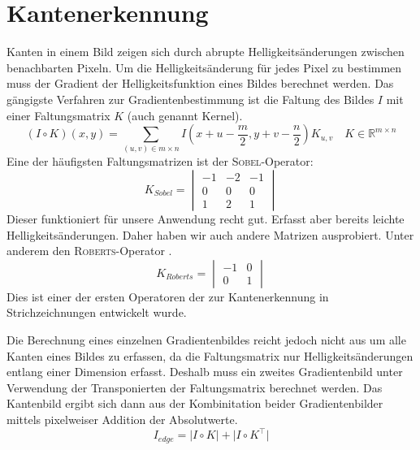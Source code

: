\section*{Kantenerkennung}

Kanten in einem Bild zeigen sich durch abrupte Helligkeitsänderungen zwischen
benachbarten Pixeln.
Um die Helligkeitsänderung für jedes Pixel zu bestimmen muss der Gradient der
Helligkeitsfunktion eines Bildes berechnet werden.
Das gängigste Verfahren zur Gradientenbestimmung ist die Faltung des Bildes $I$
mit einer Faltungsmatrix $K$ (auch genannt Kernel).
  \[ (I\circ K)(x,y) =
       \sum_{(u,v)\in m\times n}
       I\left(x+u-\frac{m}{2},y+v-\frac{n}{2}\right)K_{u,v}
       \quad K\in\mathbb{R}^{m\times n} \]
Eine der häufigsten Faltungsmatrizen ist der \textsc{Sobel}-Operator:
  \[ K_{Sobel} = \begin{vmatrix}
           -1 & -2 & -1 \\
            0 &  0 &  0 \\
            1 &  2 &  1
         \end{vmatrix} \]
Dieser funktioniert für unsere Anwendung recht gut. Erfasst aber bereits leichte
Helligkeitsänderungen.
Daher haben wir auch andere Matrizen ausprobiert.
Unter anderem den \textsc{Roberts}-Operator \cite{DBLP:books/garland/Roberts63}.
  \[ K_{Roberts} = \begin{vmatrix}
           -1 & 0 \\
            0 & 1
         \end{vmatrix} \]
Dies ist einer der ersten Operatoren der zur Kantenerkennung in
Strichzeichnungen entwickelt wurde.

Die Berechnung eines einzelnen Gradientenbildes reicht jedoch nicht aus um alle
Kanten eines Bildes zu erfassen, da die Faltungsmatrix nur Helligkeitsänderungen
entlang einer Dimension erfasst.
Deshalb muss ein zweites Gradientenbild unter Verwendung der Transponierten der
Faltungsmatrix berechnet werden.
Das Kantenbild ergibt sich dann aus der Kombinitation beider Gradientenbilder
mittels pixelweiser Addition der Absolutwerte.
  \[ I_{edge} = \Big|I \circ K\Big| + \Big|I \circ K^\top\Big| \]

